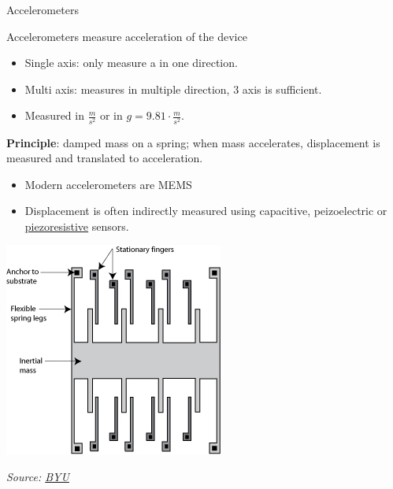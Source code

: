 \documentclass[compress]{beamer}
\newcommand{\source}[2]{\tiny\it Source: \href{#1}{#2}}
\begin{document}
\begin{frame}{Accelerometers}

Accelerometers measure acceleration of the device

\begin{itemize}

\item Single axis: only measure a in one direction.
\item Multi axis: measures in multiple direction, 3 axis is sufficient.
\item Measured in $\frac{m}{s^2}$ or in $g = 9.81\cdot\frac{m}{s^2}$.
\end{itemize}

{\bf Principle}: damped mass on a spring; when mass accelerates,
displacement is measured and translated to acceleration.

\begin{multicols}{2}
\begin{itemize}

\item Modern accelerometers are MEMS

\item Displacement is often indirectly measured using capacitive, peizoelectric
    or \href{http://en.wikipedia.org/wiki/Piezoresistive_effect}{piezoresistive}
    sensors.

    \vfill
    \columnbreak

\end{itemize}

    \begin{center}
        \includegraphics[width=0.6\linewidth]{accelero}

\source{http://research.et.byu.edu/llhwww/intro/memsintro.html}{BYU}
    \end{center}
\end{multicols}



\end{frame}
\end{document}
